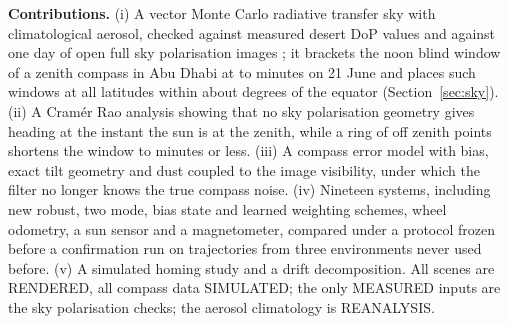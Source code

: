 \textbf{Contributions.} (i) A vector Monte Carlo radiative transfer sky with climatological aerosol, checked against measured desert DoP values \cite{horvath} and against one day of open full sky polarisation images \cite{poughon24}; it brackets the noon blind window of a zenith compass in Abu Dhabi at \sWinAnch{} to \sWinRT{} minutes on 21 June and places such windows at all latitudes within about \sLatMax{} degrees of the equator (Section~\ref{sec:sky}). (ii) A Cram\'er Rao analysis showing that no sky polarisation geometry gives heading at the instant the sun is at the zenith, while a ring of off zenith points shortens the window to \sWinRing{} minutes or less. (iii) A compass error model with bias, exact tilt geometry and dust coupled to the image visibility, under which the filter no longer knows the true compass noise. (iv) Nineteen systems, including new robust, two mode, bias state and learned weighting schemes, wheel odometry, a sun sensor and a magnetometer, compared under a protocol frozen before a confirmation run on \sNconf{} trajectories from three environments never used before. (v) A simulated homing study and a drift decomposition. All scenes are RENDERED, all compass data SIMULATED; the only MEASURED inputs are the sky polarisation checks; the aerosol climatology is REANALYSIS.
